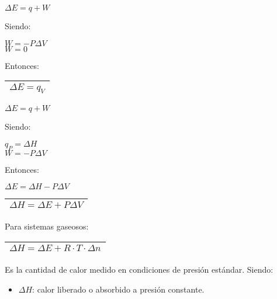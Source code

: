             \saltoPag{}
            \begin{center} $\Delta E = q + W$ \\[5pt] \end{center}
            Siendo:
            \begin{center} $W = - P \Delta V$ \\[5pt] $W = 0$ \end{center}
            Entonces:
            \begin{center}
                \begin{tabular}{| c |}
                    \hline 
                    $\Delta E = q_V$ \\ 
                    \hline 
                \end{tabular} 
            \end{center}
            \begin{center} $\Delta E = q + W$ \end{center}
            Siendo:
            \begin{center}
                $q_P = \Delta H$ \\[5pt]
                $W = -P \Delta V$
            \end{center}
            Entonces:
            \begin{center}
                $\Delta E = \Delta H - P \Delta V$ \\[5pt]
                \begin{tabular}{| c |}
                    \hline
                    $\Delta H = \Delta E + P \Delta V $ \\
                    \hline
                \end{tabular}
            \end{center}
            Para sistemas gaseosos:
            \begin{center} \begin{tabular}{| c |} \hline $\Delta H = \Delta E + R \cdot T \cdot \Delta n$ \\ \hline \end{tabular} \end{center}
            \sangria{} Es la cantidad de calor medido en condiciones de presión estándar.
            Siendo:
            \begin{itemize} 
                \item $\Delta H$: calor liberado o absorbido a presión constante. 
            \end{itemize}
        
